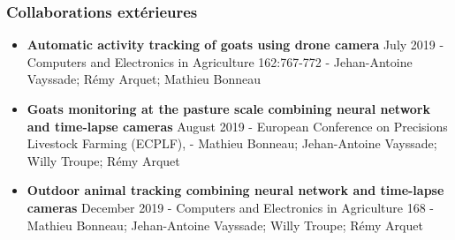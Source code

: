 \documentclass[12pt, a4paper, twoside]{scrbook}
\begin{document}
	\subsubsection*{Collaborations extérieures}
	\begin{itemize}
		\item \textbf{Automatic activity tracking of goats using drone camera} July 2019 - Computers and Electronics in Agriculture 162:767-772 - Jehan-Antoine Vayssade; Rémy Arquet; Mathieu Bonneau
		\item \textbf{Goats monitoring at the pasture scale combining neural network and time-lapse cameras} August 2019 - European Conference on Precisions Livestock Farming (ECPLF), - Mathieu Bonneau; Jehan-Antoine Vayssade; Willy Troupe; Rémy Arquet
		\item \textbf{Outdoor animal tracking combining neural network and time-lapse cameras} December 2019 - Computers and Electronics in Agriculture 168 - Mathieu Bonneau; Jehan-Antoine Vayssade; Willy Troupe; Rémy Arquet
	\end{itemize}


	\null
	\newpage

    
\end{document}
